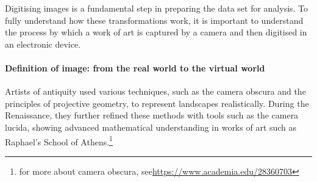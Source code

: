 Digitising images is a fundamental step in preparing the data set for analysis. To fully understand how these transformations work, it is important to understand the process by which a work of art is captured by a camera and then digitised in an electronic device.

\paragraph{Definition of image: from the real world to the virtual world}
Artists of antiquity used various techniques, such as the camera obscura and the principles of projective geometry, to represent landscapes realistically. During the Renaissance, they further refined these methods with tools such as the camera lucida, showing advanced mathematical understanding in works of art such as Raphael's School of Athens.\footnote{for more about camera obscura, see\newline\url{https://www.academia.edu/28360703}}

